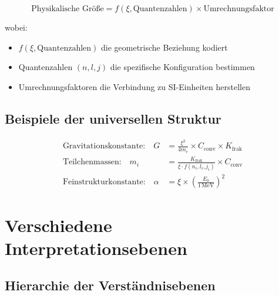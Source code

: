 	\begin{equation}
		\boxed{\text{Physikalische Größe} = f(\xi, \text{Quantenzahlen}) \times \text{Umrechnungsfaktor}}
		\label{eq:universal_pattern}
	\end{equation}
	
	wobei:
	\begin{itemize}
		\item $f(\xi, \text{Quantenzahlen})$ die geometrische Beziehung kodiert
		\item Quantenzahlen $(n,l,j)$ die spezifische Konfiguration bestimmen
		\item Umrechnungsfaktoren die Verbindung zu SI-Einheiten herstellen
	\end{itemize}
	
	\subsection{Beispiele der universellen Struktur}
	
	\begin{align}
		\text{Gravitationskonstante:} \quad G &= \frac{\xi^2}{4m_e} \times C_{\text{conv}} \times K_{\text{frak}} \\
		\text{Teilchenmassen:} \quad m_i &= \frac{K_{\text{frak}}}{\xi \cdot f(n_i,l_i,j_i)} \times C_{\text{conv}} \\
		\text{Feinstrukturkonstante:} \quad \alpha &= \xi \times \left(\frac{E_0}{1\,\mathrm{MeV}}\right)^2
	\end{align}
	
	\section{Verschiedene Interpretationsebenen}
	
	\subsection{Hierarchie der Verständnisebenen}
	
